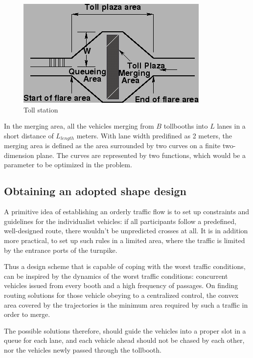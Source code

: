 \documentclass{mcmthesis}
\begin{document}
\begin{figure}[htbp]
	\small
	\centering
	\caption{Toll station \cite{note}} \label{fig:Ts}
	\includegraphics{img3.png}
\end{figure}

In the merging area, all the vehicles merging from $B$ tollbooths into $L$ lanes in a short distance of $L_{length}$ meters.
With lane width predifined as 2 meters, the merging area is defined as the area surrounded by two curves on a finite two-dimension plane. The curves are represented by two functions, which would be a parameter to be optimized in the problem.

\subsection{Obtaining an adopted shape design}

A primitive idea of establishing an orderly traffic flow is to set up constraints and guidelines for the individualist vehicles: if all participants follow a predefined, well-designed route, there wouldn't be unpredicted crosses at all. It is in addition more practical, to set up such rules in a limited area, where the traffic is limited by the entrance ports of the turnpike.

Thus a design scheme that is capable of coping with the worst traffic conditions, can be inspired by the dynamics of the worst traffic conditions: concurrent vehicles issued from every booth and a high frequency of passages. On finding routing solutions for those vehicle obeying to a centralized control, the convex area covered by the trajectories is the minimum area required by such a traffic in order to merge.

The possible solutions therefore, should guide the vehicles into a proper slot in a queue for each lane, and each vehicle ahead should not be chased by each other, nor the vehicles newly passed through the tollbooth.
\end{document}
